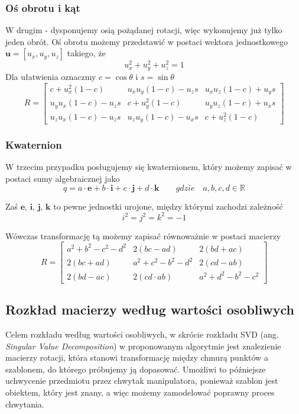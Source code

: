 \documentclass{article}
\begin{document}
\subsubsection*{\Large{Oś obrotu i kąt}}
W drugim - dysponujemy osią pożądanej rotacji, więc wykonujemy już tylko jeden obrót. Oś obrotu możemy przedstawić w postaci wektora jednostkowego $\textbf{u} = [u_{x}, u_{y}, u_{z}]$ takiego, że 
\[u_{x}^2+u_{y}^2+u_{z}^2 = 1 \]
Dla ułatwienia oznaczmy $c = \cos \theta$ i $s = \sin \theta$
\[
R = \begin{bmatrix}
c+u_{x}^2(1-c) & u_{x}u_{y}(1-c)-u_{z}s & u_{x}u_{z}(1-c)+u_{y}s \\
u_{y}u_{x}(1-c)-u_{z}s & c+u_{y}^2(1-c) & u_{y}u_{z}(1-c)+u_{x}s \\
u_{z}u_{x}(1-c)-u_{z}s & u_{z}u_{y}(1-c)-u_{x}s & c+u_{z}^2(1-c)
\end{bmatrix}
\]

\subsubsection*{\Large{Kwaternion}}
W trzecim przypadku posługujemy się kwaternionem, który możemy zapisać w postaci sumy algebraicznej jako
\[q = a \cdot \textbf{e} + b \cdot \textbf{i} + c \cdot \textbf{j} + d \cdot \textbf{k} \qquad gdzie \quad a, b, c, d \in \mathbb{R} \]

Zaś $\textbf{e, i, j, k}$ to pewne jednostki urojone, między którymi zachodzi zależność 
\[i^2 = j^2 = k^2 = -1 \]

Wówczas transformację tą możemy zapisać równoważnie w postaci macierzy
\[
R = \begin{bmatrix}
a^2+b^2-c^2-d^2 & 2(bc-ad) & 2(bd+ac) \\
2(bc+ad) & a^2+c^2-b^2-d^2 & 2(cd-ab) \\
2(bd-ac) & 2(cd \cdot ab) & a^2+d^2-b^2-c^2
\end{bmatrix}
\]

\newpage
\subsection{\LARGE{Rozkład macierzy według wartości osobliwych}}
Celem rozkładu według wartości osobliwych, w skrócie rozkładu SVD (ang. \emph{Singular Value Decomposition}) w proponowanym algorytmie jest znalezienie macierzy rotacji, która stanowi transformację między chmurą punktów a szablonem, do którego próbujemy ją dopasować. Umożliwi to późniejsze uchwycenie przedmiotu przez chwytak manipulatora, ponieważ szablon jest obiektem, który jest znany, a więc możemy zamodelować poprawny proces chwytania.
\end{document}
